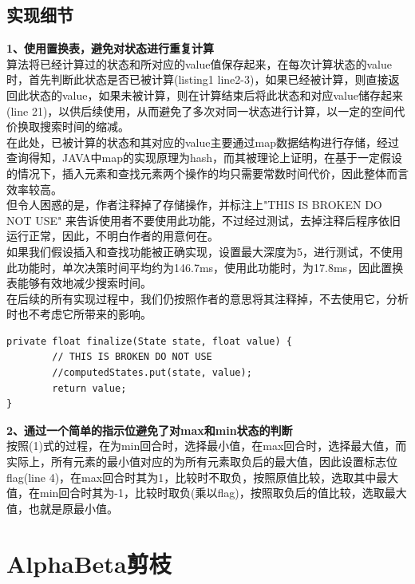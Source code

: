 \documentclass[UTF8]{article}
\begin{document}
\subsection{实现细节}
\indent\textbf{1、使用置换表，避免对状态进行重复计算}\\
\indent 算法将已经计算过的状态和所对应的value值保存起来，在每次计算状态的value时，首先判断此状态是否已被计算(listing1 line2-3)，如果已经被计算，则直接返回此状态的value，如果未被计算，则在计算结束后将此状态和对应value储存起来(line 21)，以供后续使用，从而避免了多次对同一状态进行计算，以一定的空间代价换取搜索时间的缩减。\\
\indent 在此处，已被计算的状态和其对应的value主要通过map数据结构进行存储，经过查询得知，JAVA中map的实现原理为hash，而其被理论上证明，在基于一定假设的情况下，插入元素和查找元素两个操作的均只需要常数时间代价，因此整体而言效率较高。\\
\indent 但令人困惑的是，作者注释掉了存储操作，并标注上"THIS IS BROKEN DO NOT USE" 来告诉使用者不要使用此功能，不过经过测试，去掉注释后程序依旧运行正常，因此，不明白作者的用意何在。\\
\indent 如果我们假设插入和查找功能被正确实现，设置最大深度为5，进行测试，不使用此功能时，单次决策时间平均约为146.7ms，使用此功能时，为17.8ms，因此置换表能够有效地减少搜索时间。\\
\indent 在后续的所有实现过程中，我们仍按照作者的意思将其注释掉，不去使用它，分析时也不考虑它所带来的影响。\\
\begin{lstlisting}[caption=存储state-value pair]
private float finalize(State state, float value) {
		// THIS IS BROKEN DO NOT USE
		//computedStates.put(state, value);
		return value;
}
\end{lstlisting}

\indent\textbf{2、通过一个简单的指示位避免了对max和min状态的判断}\\
\indent 按照(1)式的过程，在为min回合时，选择最小值，在max回合时，选择最大值，而实际上，所有元素的最小值对应的为所有元素取负后的最大值，因此设置标志位flag(line 4)，在max回合时其为1，比较时不取负，按照原值比较，选取其中最大值，在min回合时其为-1，比较时取负(乘以flag)，按照取负后的值比较，选取最大值，也就是原最小值。

\section{AlphaBeta剪枝}
\end{document}
